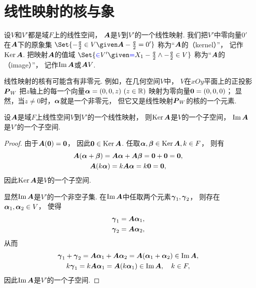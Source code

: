 \section{线性映射的核与象}
\begin{definition}
设\(V\)和\(V'\)都是域\(F\)上的线性空间，
\(\boldsymbol{A}\)是\(V\)到\(V'\)的一个线性映射.
我们把\(V'\)中零向量\(0'\)在\(\boldsymbol{A}\)下的原象集
\(\Set{
	\a\in V
	\given
	\vb{A}\a=0'
}\)
称为“\(\boldsymbol{A}\)的（kernel）”，
记作\(\operatorname{Ker}\boldsymbol{A}\).
把映射\(\boldsymbol{A}\)的值域
\(\Set{
	\b \in V'
	\given
	\b = \A\a
	\land
	\a \in V
}\)
称为“\(\boldsymbol{A}\)的（image）”，
记作\(\Im\boldsymbol{A}\)或\(\boldsymbol{A}V\).
\end{definition}
\begin{remark}
线性映射的核有可能含有非零元.
例如，在几何空间\(V\)中，
\(V\)在\(xOy\)平面上的正投影\(\boldsymbol{P}_W\)
把\(z\)轴上的每一个向量\(\boldsymbol\alpha=(0,0,z)\ (z\in\mathbb{R})\)
映射为零向量\(\boldsymbol0=(0,0,0)\)；
显然，当\(z\neq0\)时，\(\boldsymbol\alpha\)就是一个非零元，
但它又是线性映射\(\boldsymbol{P}_W\)的核的一个元素.
\end{remark}

\begin{proposition}
设\(\boldsymbol{A}\)是域\(F\)上线性空间\(V\)到\(V'\)的一个线性映射，
则\(\operatorname{Ker}\boldsymbol{A}\)是\(V\)的一个子空间，
\(\Im\boldsymbol{A}\)是\(V'\)的一个子空间.
\begin{proof}
由于\(\boldsymbol{A}(\boldsymbol0)=\boldsymbol0\)，
因此\(\boldsymbol0 \in \operatorname{Ker}\boldsymbol{A}\).
任取\(\boldsymbol\alpha,\boldsymbol\beta \in \operatorname{Ker}\boldsymbol{A},
k \in F\)，
则有\begin{gather*}
	\boldsymbol{A}(\boldsymbol\alpha+\boldsymbol\beta)
	= \boldsymbol{A}\boldsymbol\alpha + \boldsymbol{A}\boldsymbol\beta
	= \boldsymbol0 + \boldsymbol0
	= \boldsymbol0, \\
	\boldsymbol{A}(k\boldsymbol\alpha)
	= k \boldsymbol{A}\boldsymbol\alpha
	= k\boldsymbol0
	= \boldsymbol0,
\end{gather*}
因此\(\operatorname{Ker}\boldsymbol{A}\)是\(V\)的一个子空间.

显然\(\Im\boldsymbol{A}\)是\(V'\)的一个非空子集.
在\(\Im\boldsymbol{A}\)中任取两个元素\(\boldsymbol\gamma_1,\boldsymbol\gamma_2\)，
则存在\(\boldsymbol\alpha_1,\boldsymbol\alpha_2 \in V\)，
使得\begin{gather*}
	\boldsymbol\gamma_1 = \boldsymbol{A}\boldsymbol\alpha_1, \\
	\boldsymbol\gamma_2 = \boldsymbol{A}\boldsymbol\alpha_2,
\end{gather*}
从而\begin{gather*}
	\boldsymbol\gamma_1 + \boldsymbol\gamma_2
	= \boldsymbol{A}\boldsymbol\alpha_1 + \boldsymbol{A}\boldsymbol\alpha_2
	= \boldsymbol{A}(\boldsymbol\alpha_1 + \boldsymbol\alpha_2)
	\in \Im\boldsymbol{A}, \\
	k \boldsymbol\gamma_1
	= k \boldsymbol{A}\boldsymbol\alpha_1
	= \boldsymbol{A}(k \boldsymbol\alpha_1)
	\in \Im\boldsymbol{A},
	\quad k \in F,
\end{gather*}
因此\(\Im\boldsymbol{A}\)是\(V'\)的一个子空间.
\end{proof}
\end{proposition}

